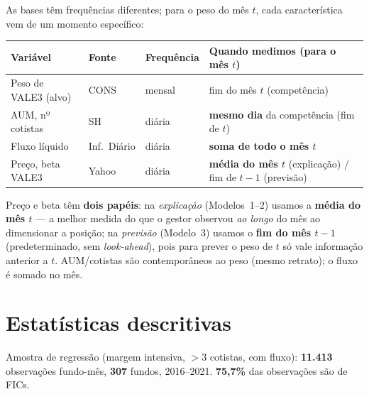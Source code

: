 \documentclass[11pt]{article}
\begin{document}
As bases têm frequências diferentes; para o peso do mês $t$, cada característica vem de
um momento específico:

\begin{table}[h]\centering\small
\begin{tabular}{@{}llll@{}}
\toprule
Variável & Fonte & Frequência & Quando medimos (para o mês $t$) \\
\midrule
Peso de VALE3 (alvo) & CONS & mensal & fim do mês $t$ (competência) \\
AUM, nº cotistas     & SH   & diária & \textbf{mesmo dia} da competência (fim de $t$) \\
Fluxo líquido        & Inf.\ Diário & diária & \textbf{soma de todo o mês $t$} \\
Preço, beta VALE3    & Yahoo & diária & \textbf{média do mês $t$} (explicação) / fim de $t{-}1$ (previsão) \\
\bottomrule
\end{tabular}
\end{table}
\noindent\footnotesize Preço e beta têm \textbf{dois papéis}: na \emph{explicação}
(Modelos~1--2) usamos a \textbf{média do mês $t$} --- a melhor medida do que o gestor
observou \emph{ao longo} do mês ao dimensionar a posição; na \emph{previsão} (Modelo~3)
usamos o \textbf{fim do mês $t-1$} (predeterminado, sem \emph{look-ahead}), pois para
prever o peso de $t$ só vale informação anterior a $t$. AUM/cotistas são contemporâneos
ao peso (mesmo retrato); o fluxo é somado no mês. \normalsize

\section{Estatísticas descritivas}

Amostra de regressão (margem intensiva, $>3$ cotistas, com fluxo): \textbf{11.413}
observações fundo-mês, \textbf{307} fundos, 2016--2021. \textbf{75,7\%} das observações
são de FICs.
\end{document}
